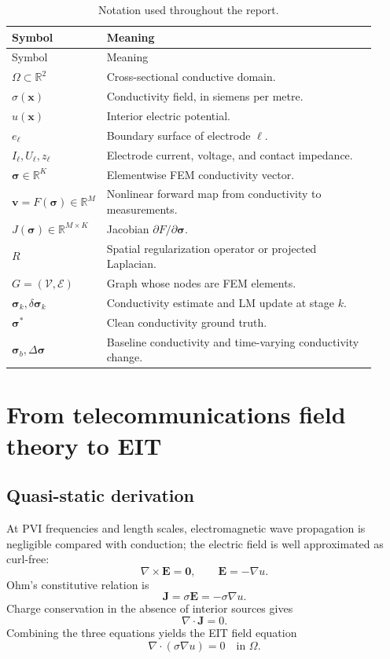 \documentclass[11pt]{article}
\newcommand{\R}{\mathbb{R}}
\newcommand{\sig}{\bm{\sigma}}
\newcommand{\dsig}{\Delta\bm{\sigma}}
\begin{document}
\begin{longtable}{@{}p{0.18\linewidth}p{0.74\linewidth}@{}}
\caption{Notation used throughout the report.}\label{tab:notation}\\
\toprule
Symbol & Meaning \\
\midrule
\endfirsthead
\toprule
Symbol & Meaning \\
\midrule
\endhead
$\Omega\subset\R^2$ & Cross-sectional conductive domain. \\
$\sigma(\bm{x})$ & Conductivity field, in siemens per metre. \\
$u(\bm{x})$ & Interior electric potential. \\
$e_\ell$ & Boundary surface of electrode $\ell$. \\
$I_\ell,U_\ell,z_\ell$ & Electrode current, voltage, and contact impedance. \\
$\sig\in\R^K$ & Elementwise FEM conductivity vector. \\
$\bm{v}=F(\sig)\in\R^M$ & Nonlinear forward map from conductivity to measurements. \\
$J(\sig)\in\R^{M\times K}$ & Jacobian $\partial F/\partial\sig$. \\
$R$ & Spatial regularization operator or projected Laplacian. \\
$G=(\mathcal V,\mathcal E)$ & Graph whose nodes are FEM elements. \\
$\sig_k,\delta\sig_k$ & Conductivity estimate and LM update at stage $k$. \\
$\sig^*$ & Clean conductivity ground truth. \\
$\sig_b,\dsig$ & Baseline conductivity and time-varying conductivity change. \\
\bottomrule
\end{longtable}

\section{From telecommunications field theory to EIT}

\subsection{Quasi-static derivation}

At PVI frequencies and length scales, electromagnetic wave propagation is
negligible compared with conduction; the electric field is well approximated as
curl-free:
\begin{equation}
  \nabla\times\bm{E}=\bm{0},
  \qquad \bm{E}=-\nabla u.
\end{equation}
Ohm's constitutive relation is
\begin{equation}
  \bm{J}=\sigma\bm{E}=-\sigma\nabla u.
\end{equation}
Charge conservation in the absence of interior sources gives
\begin{equation}
  \nabla\cdot\bm{J}=0.
\end{equation}
Combining the three equations yields the EIT field equation
\begin{equation}
  \boxed{\nabla\cdot\left(\sigma\nabla u\right)=0\quad\text{in }\Omega.}
  \label{eq:eit-pde}
\end{equation}
\end{document}
